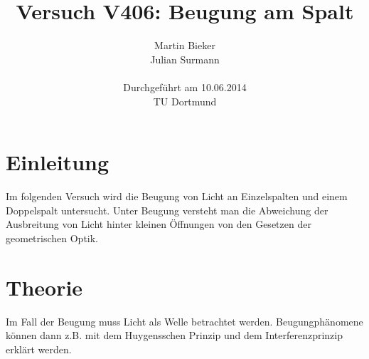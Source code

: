 \documentclass[11pt,ngerman,a4paper]{article}
\title{\textbf{Versuch V406: Beugung am Spalt}}
\author{Martin Bieker\\
Julian Surmann\\
\\
Durchgef\"{u}hrt am 10.06.2014\\
TU Dortmund}
\date{}
\begin{document}
\renewcommand\tablename{Tabelle}
\renewcommand\figurename{Abbildung}
\maketitle
\thispagestyle{empty}
\newpage
\clearpage
\setcounter{page}{1}


\section{Einleitung}
Im folgenden Versuch wird die Beugung von Licht an Einzelspalten und einem Doppelspalt untersucht. Unter Beugung versteht man die Abweichung der Ausbreitung von Licht hinter kleinen Öffnungen von den Gesetzen der geometrischen Optik.
\section{Theorie}
Im Fall der Beugung muss Licht als Welle betrachtet werden. Beugungphänomene können dann z.B. mit dem Huygensschen Prinzip und dem Interferenzprinzip erklärt werden.
\end{document}
